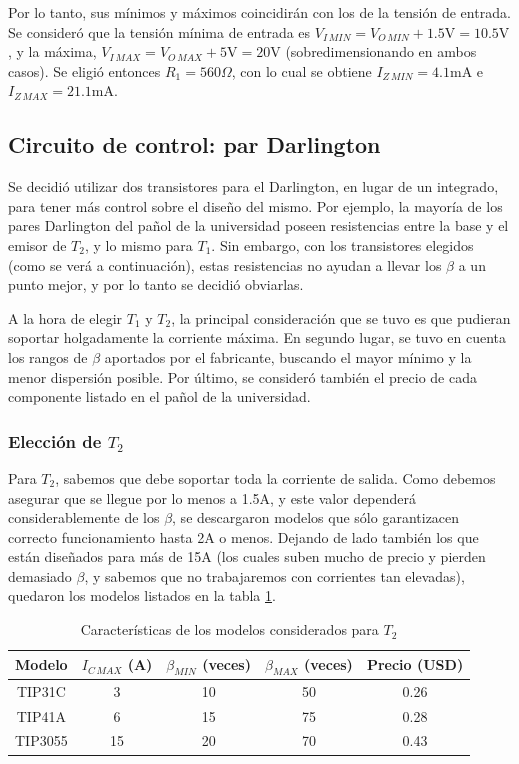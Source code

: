 \documentclass[e2_tp1_main.tex]{subfiles}
\begin{document}
Por lo tanto, sus m\'inimos y m\'aximos coincidir\'an con los de la tensi\'on de entrada. Se consider\'o que la tensi\'on m\'inima de entrada es $V_{I\, MIN} = V_{O\, MIN} + 1.5\mathrm{V} = 10.5\mathrm{V}$, y la m\'axima,  $V_{I\, MAX} = V_{O\, MAX} + 5\mathrm{V} = 20\mathrm{V}$ (sobredimensionando en ambos casos). Se eligi\'o entonces $R_1=560\Omega$, con lo cual se obtiene $I_{Z\, MIN} = 4.1$mA e $I_{Z\, MAX} = 21.1$mA.


\subsection{Circuito de control: par Darlington}

Se decidi\'o utilizar dos transistores para el Darlington, en lugar de un integrado, para tener m\'as control sobre el dise\~no del mismo. Por ejemplo, la mayor\'ia de los pares Darlington del pa\~nol de la universidad poseen resistencias entre la base y el emisor de $T_2$, y lo mismo para $T_1$. Sin embargo, con los transistores elegidos (como se ver\'a a continuaci\'on), estas resistencias no ayudan a llevar los $\beta$ a un punto mejor, y por lo tanto se decidi\'o obviarlas.
 
A la hora de elegir $T_1$ y $T_2$, la principal consideraci\'on que se tuvo es que pudieran soportar holgadamente la corriente m\'axima. En segundo lugar, se tuvo en cuenta los rangos de $\beta$ aportados por el fabricante, buscando el mayor m\'inimo y la menor dispersi\'on posible. Por \'ultimo, se consider\'o tambi\'en el precio de cada componente listado en el pa\~nol de la universidad.


\subsubsection{Elecci\'on de $T_2$}

Para $T_2$, sabemos que debe soportar toda la corriente de salida. Como debemos asegurar que se llegue por lo menos a 1.5A, y este valor depender\'a considerablemente de los $\beta$, se descargaron modelos que s\'olo garantizacen correcto funcionamiento hasta 2A o menos. Dejando de lado tambi\'en los que est\'an dise\~nados para m\'as de 15A (los cuales suben mucho de precio y pierden demasiado $\beta$, y sabemos que no trabajaremos con corrientes tan elevadas), quedaron los modelos listados en la tabla \ref{table:modelos-t2}.

\begin{table}[ht!]
	\centering
	\begin{tabular}{|c|c|c|c|c|}
		\hline 
		Modelo & $I_{C\, MAX}$ (A) & $\beta_{MIN}$ (veces) & $\beta_{MAX}$ (veces) & Precio (USD) \\ 
		\hline \hline
		TIP31C & 3 & 10 & 50 & 0.26 \\ 
		\hline 
		TIP41A & 6 & 15 & 75 & 0.28 \\ 
		\hline 
		TIP3055 & 15 & 20 & 70 & 0.43 \\ 
		\hline 
		\end{tabular} 	
	\caption{Caracter\'isticas de los modelos considerados para $T_2$}
	\label{table:modelos-t2}
\end{table}
\end{document}
